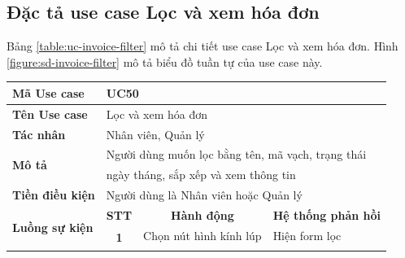 \documentclass[../DoAn.tex]{subfiles}
\begin{document}
\subsection{Đặc tả use case Lọc và xem hóa đơn}
\label{section:uc-invoice-filter}
Bảng \ref{table:uc-invoice-filter} mô tả chi tiết use case Lọc và xem hóa đơn. Hình \ref{figure:sd-invoice-filter} mô tả biểu đồ tuần tự của use case này.
\begin{table}[H]
    \begin{tabular}{|l|c|l|l|}
        \hline
        \textbf{Mã Use case}                    & \multicolumn{3}{l|}{UC50}                                                                                                                                          \\ \hline
        \textbf{Tên Use case}                   & \multicolumn{3}{l|}{Lọc và xem hóa đơn}                                                                                                                            \\ \hline
        \textbf{Tác nhân}                       & \multicolumn{3}{l|}{Nhân viên, Quản lý}                                                                                                                            \\ \hline
        \multirow{2}{*}{\textbf{Mô tả} }        & \multicolumn{3}{l|}{Người dùng muốn lọc bằng tên, mã vạch, trạng thái}                                                                                             \\
                                                & \multicolumn{3}{l|}{ngày tháng, sắp xếp và xem thông tin}                                                                                                          \\ \hline
        \textbf{Tiền điều kiện}                 & \multicolumn{3}{l|}{Người dùng là Nhân viên hoặc Quản lý}                                                                                                          \\ \hline
        \multirow{7}{*}{\textbf{Luồng sự kiện}} & \multicolumn{1}{c|}{\textbf{STT}}                                      & \multicolumn{1}{c|}{\textbf{Hành động}} & \multicolumn{1}{c|}{\textbf{Hệ thống phản hồi}} \\ \cline{2-4}
                                                & \multirow{6}{*}{\textbf{1}}                                            & Chọn nút hình kính lúp                  & Hiện form lọc                                   \\ \cline{3-4}

\end{tabular}
\end{table}
\end{document}
